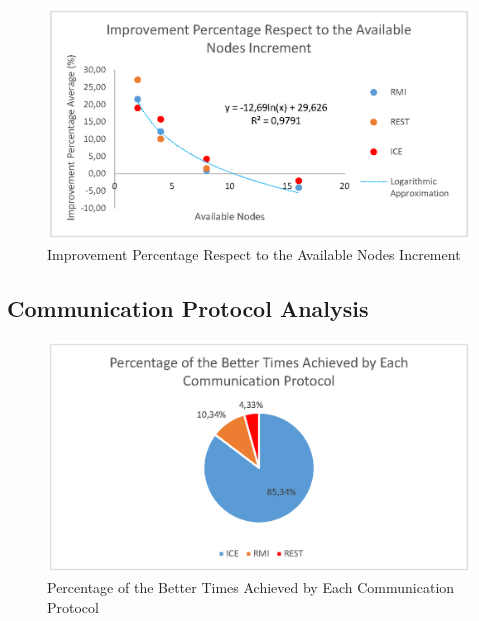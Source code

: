 	\begin{figure}
		\centering
		\includegraphics[trim=0.5cm 19cm 1cm 1cm]{fig/availableNodes.eps}
		\caption{Improvement Percentage Respect to the Available Nodes Increment}
		\label{fig:availableNodes}
	\end{figure}

\subsection{Communication Protocol Analysis}

\begin{figure}
	\centering
	\includegraphics[trim=0.5cm 19cm 1cm 1cm]{fig/betterTimesCommunicationProtocol.eps}
	\caption{Percentage of the Better Times Achieved by Each Communication Protocol}
	\label{fig:betterTimesCommunicationProtocol}
\end{figure}

